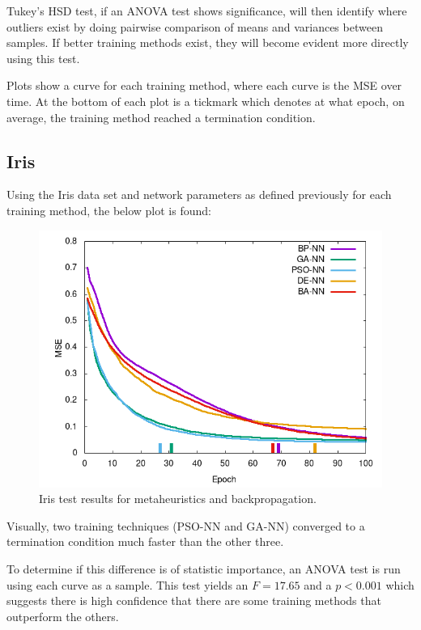 \documentclass[a4paper,12pt]{article}
\begin{document}
Tukey's HSD test, if an ANOVA test shows significance, will then identify where outliers exist by doing pairwise comparison of means and variances between samples. If better training methods exist, they will become evident more directly using this test.

Plots show a curve for each training method, where each curve is the MSE over time. At the bottom of each plot is a tickmark which denotes at what epoch, on average, the training method reached a termination condition.

\pagebreak

\subsection{Iris}

Using the Iris data set and network parameters as defined previously for each training method, the below plot is found:

\begin{figure}[h!]
\centering
\includegraphics[scale=0.65]{images/iris-plot.png}
\caption{Iris test results for metaheuristics and backpropagation.}
\label{fig:iris}
\end{figure}

Visually, two training techniques (PSO-NN and GA-NN) converged to a termination condition much faster than the other three.

To determine if this difference is of statistic importance, an ANOVA test is run using each curve as a sample. This test yields an $F = 17.65$ and a $p < 0.001$ which suggests there is high confidence that there are some training methods that outperform the others.
\end{document}
